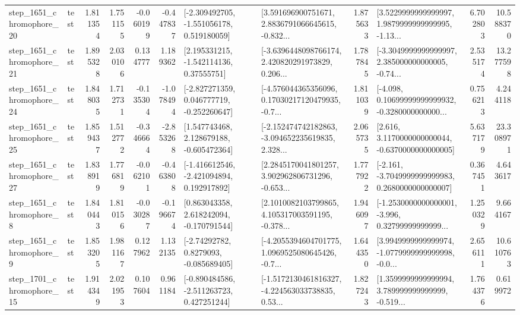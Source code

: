 \begin{tabular}{llrrrrllrlrr}
 step\_1651\_chromophore\_20 &      test &      1.811354 &    1.751155 &     -0.060199 & -0.447837 &   [-2.309492705, -1.551056178, 0.519180059] &  [3.591696900751671, 2.8836791066645615, -0.832... &       1.875633 &  [3.5229999999999997, 1.9879999999999995, -1.13... &            6.702803 &         10.588370 \\
 step\_1651\_chromophore\_21 &      test &      1.895328 &    2.030106 &      0.134777 &  1.189362 &     [2.195331215, -1.542114136, 0.37555751] &  [-3.6396448098766174, 2.420820291973829, 0.206... &       1.787845 &  [-3.3049999999999997, 2.385000000000005, -0.74... &            2.535174 &         13.277598 \\
 step\_1651\_chromophore\_24 &      test &      1.848035 &    1.712731 &     -0.135304 & -1.078494 &   [-2.827271359, 0.046777719, -0.252260647] &  [-4.576044365356096, 0.17030217120479935, -0.7... &       1.811039 &  [-4.098, 0.10699999999999932, -0.3280000000000... &            0.756213 &          4.244118 \\
 step\_1651\_chromophore\_25 &      test &      1.859437 &    1.512772 &     -0.346664 & -2.853268 &    [1.547743468, 2.128679188, -0.605472364] &  [-2.152474742182863, -3.094652235619835, 2.328... &       2.065735 &   [2.616, 3.1170000000000044, -0.6370000000000005] &            5.637179 &         23.308971 \\
 step\_1651\_chromophore\_27 &      test &      1.838919 &    1.776819 &     -0.062101 & -0.463808 &   [-1.416612546, -2.421094894, 0.192917892] &  [2.2845170041801257, 3.902962806731296, -0.653... &       1.777922 &  [-2.161, -3.7049999999999983, 0.2680000000000007] &            0.367451 &          4.643617 \\
  step\_1651\_chromophore\_8 &      test &      1.840443 &    1.810156 &     -0.030287 & -0.196674 &    [0.863043358, 2.618242094, -0.170791544] &  [2.1010082103799865, 4.105317003591195, -0.378... &       1.946097 &  [-1.2530000000000001, -3.996, 0.32799999999999... &            1.250329 &          9.664167 \\
  step\_1651\_chromophore\_9 &      test &      1.853205 &    1.981167 &      0.127962 &  1.132135 &      [-2.74292782, 0.8279093, -0.085689405] &  [-4.2055394604701775, 1.0969525080645426, -0.7... &       1.644350 &  [3.9949999999999974, -1.0779999999999998, -0.0... &            2.656111 &         10.610763 \\
 step\_1701\_chromophore\_15 &      test &      1.914349 &    2.021953 &      0.107604 &  0.961184 &   [-0.890484586, -2.511263723, 0.427251244] &  [-1.5172130461816327, -4.224563033738835, 0.53... &       1.827243 &  [1.3599999999999994, 3.789999999999999, -0.519... &            1.764376 &          0.619972 \\

\end{tabular}
